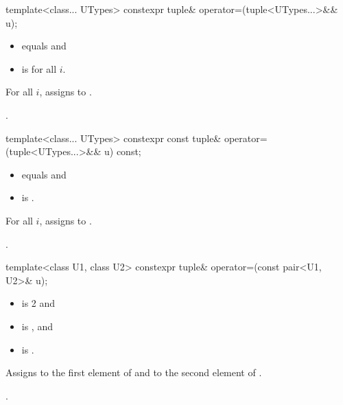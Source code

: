 \documentclass{wg21}
\begin{document}
%
\begin{itemdecl}
    template<class... UTypes> constexpr tuple& operator=(tuple<UTypes...>&& u);
\end{itemdecl}

\begin{itemdescr}
    \pnum
    \constraints
    \begin{itemize}
        \item {} equals  and
        \item {} is  for all $i$.
    \end{itemize}

    \pnum
    \effects
    For all $i$, assigns  to
    .

    \pnum
    \returns
    .
\end{itemdescr}

%
\begin{itemdecl}
    template<class... UTypes> constexpr const tuple& operator=(tuple<UTypes...>&& u) const;
\end{itemdecl}

\begin{itemdescr}
    \pnum
    \constraints
    \begin{itemize}
        \item
         equals  and
        \item
         is .
    \end{itemize}

    \pnum
    \effects
    For all $i$,
    assigns  to .

    \pnum
    \returns
    .
\end{itemdescr}

%
%
\begin{itemdecl}
    template<class U1, class U2> constexpr tuple& operator=(const pair<U1, U2>& u);
\end{itemdecl}

\begin{itemdescr}
    \pnum
    \constraints
    \begin{itemize}
        \item {} is 2 and
        \item {} is , and
        \item {} is .
    \end{itemize}

    \pnum
    \effects
    Assigns  to the first element of 
    and  to the second element of .

    \pnum
    \returns
    .
\end{itemdescr}
\end{document}
